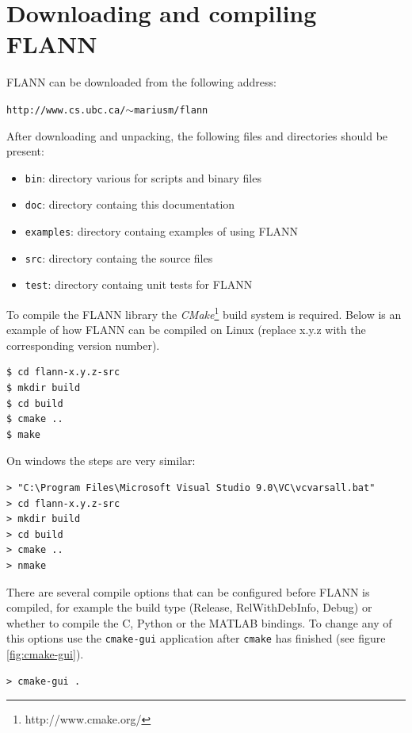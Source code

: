 \documentclass[letter,10pt]{article}
\begin{document}
\section{Downloading and compiling FLANN}
\label{sec:downloading_and_compiling}

FLANN can be downloaded from the following address:
\begin{center}
\texttt{http://www.cs.ubc.ca/$\sim$mariusm/flann}
\end{center}

After downloading and unpacking, the following files and directories should
be present:
\begin{itemize}
\item \texttt{bin}: directory various for scripts and binary files
\item \texttt{doc}: directory containg this documentation
\item \texttt{examples}: directory containg examples of using FLANN
\item \texttt{src}: directory containg the source files
\item \texttt{test}: directory containg unit tests for FLANN
\end{itemize}



To compile the FLANN library the \textit{CMake}\footnote{http://www.cmake.org/} build system is required.
Below is an example of how FLANN can be compiled on Linux (replace x.y.z with the corresponding version number).
\begin{Verbatim}[fontsize=\scriptsize,frame=single]
$ cd flann-x.y.z-src
$ mkdir build
$ cd build
$ cmake ..
$ make
\end{Verbatim}

On windows the steps are very similar:
 
\begin{Verbatim}[fontsize=\scriptsize,frame=single]
> "C:\Program Files\Microsoft Visual Studio 9.0\VC\vcvarsall.bat"
> cd flann-x.y.z-src
> mkdir build
> cd build
> cmake ..
> nmake
\end{Verbatim}

There are several compile options that can be configured before FLANN is compiled, for example the build type 
(Release, RelWithDebInfo, Debug) or whether to compile the C, Python or the MATLAB bindings. To change any of this
options use the \texttt{cmake-gui} application after \texttt{cmake} has finished (see figure \ref{fig:cmake-gui}).
\begin{Verbatim}[fontsize=\scriptsize,frame=single]
> cmake-gui .
\end{Verbatim}
\end{document}
